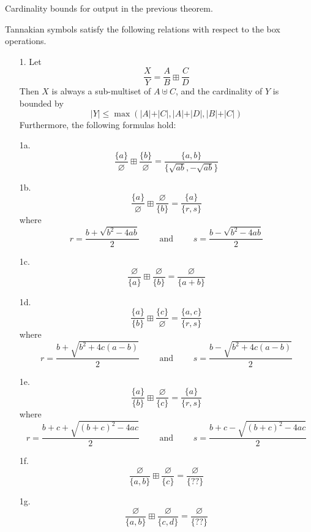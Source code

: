 \documentclass[a4paper]{article}
\begin{document}
\begin{corollary}
Cardinality bounds for output in the previous theorem.
\end{corollary}

\begin{theorem}
Tannakian symbols satisfy the following relations with respect to the box operations.
\begin{itemize}
\item[1.] Let $$\frac{X}{Y} = \frac{A}{B} \boxplus \frac{C}{D}$$
Then $X$ is always a sub-multiset of $A \uplus C$, and the cardinality of $Y$ is bounded by
$$ \vert Y \vert \leq \max ( \vert A \vert + \vert C \vert,  \vert A \vert + \vert D \vert,  \vert B \vert + \vert C \vert  )   $$
Furthermore, the following formulas hold:
\item[1a.] $$\frac{\{ a \} }{\varnothing} \boxplus \frac{ \{ b \} }{\varnothing} = \frac{ \{ a, b \}  }{ \{ \sqrt{ab} , -\sqrt{ab} \} }$$

\item[1b.] $$\frac{\{ a \} }{\varnothing} \boxplus \frac{\varnothing}{ \{ b \} } = \frac{ \{ a \}  }{ \{ r , s \} }$$
where
$$r = \frac{b + \sqrt{b^2 - 4ab}}{2} \qquad \text{\ and\ } \qquad s = \frac{b - \sqrt{b^2 - 4ab}}{2}$$

\item[1c.] $$\frac{\varnothing}{\{ a \} } \boxplus \frac{\varnothing}{ \{ b \} } = \frac{ \varnothing  }{ \{ a+b \} }$$

\item[1d.] $$ \frac{ \{ a \} }{ \{ b \}  }  \boxplus \frac{ \{ c \} }{ \varnothing  }   = \frac{\{ a, c  \}}{ \{ r, s \} }    $$
where
$$r = \frac{b + \sqrt{b^2+4c(a-b)}}{2} \qquad \text{\ and\ } \qquad s = \frac{b - \sqrt{b^2+4c(a-b)}}{2}$$

\item[1e.] $$ \frac{ \{ a \} }{ \{ b \}  }  \boxplus \frac{ \varnothing  }{ \{ c \} }  = \frac{\{ a  \}}{ \{ r, s \} }    $$
where
$$r = \frac{b+c + \sqrt{(b+c)^2 - 4ac}}{2} \qquad \text{\ and\ } \qquad s = \frac{b+c - \sqrt{(b+c)^2 - 4ac}}{2}$$

\item[1f.] $$\frac{\varnothing}{\{ a , b \} } \boxplus \frac{\varnothing}{ \{ c \} } = \frac{ \varnothing  }{ \{ ?? \} }$$



\item[1g.] $$\frac{\varnothing}{\{ a , b \} } \boxplus \frac{\varnothing}{ \{ c , d \} } = \frac{ \varnothing  }{ \{ ?? \} }$$



\end{itemize}
\end{theorem}
\end{document}
